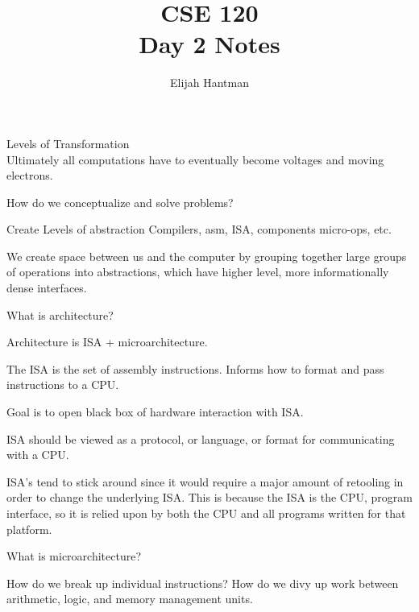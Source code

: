 \documentclass{report}
\title{\Huge{CSE 120}\\Day 2 Notes}
\author{\huge{Elijah Hantman}}
\date{}
\begin{document}
\maketitle
\newpage

\begin{description}
    \item Levels of Transformation\\
        Ultimately all computations have to
        eventually become voltages and moving
        electrons.
        \begin{mdframed}
            How do we conceptualize
            and solve problems?
            
            \vspace{10}

            Create Levels of abstraction
            Compilers, asm, ISA, components
            micro-ops, etc.

            We create space between us and the computer
            by grouping together large groups of operations
            into abstractions, which have higher level, more
            informationally dense interfaces.
        \end{mdframed}

    \item What is architecture?
        \begin{mdframed}
            Architecture is ISA + microarchitecture.

            \vspace{10}

            The ISA is the set of assembly instructions.
            Informs how to format and pass instructions to
            a CPU.

            Goal is to open black box of hardware interaction
            with ISA.

            ISA should be viewed as a protocol, or language,
            or format for communicating with a CPU.

            ISA's tend to stick around since it would require
            a major amount of retooling in order to change
            the underlying ISA. This is because the ISA is
            the CPU, program interface, so it is relied upon
            by both the CPU and all programs written for that
            platform.
        \end{mdframed}
    \item What is microarchitecture?
        \begin{mdframed}
            How do we break up individual instructions?
            How do we divy up work between arithmetic,
            logic, and memory management units.


\end{mdframed}
\end{description}
\end{document}
